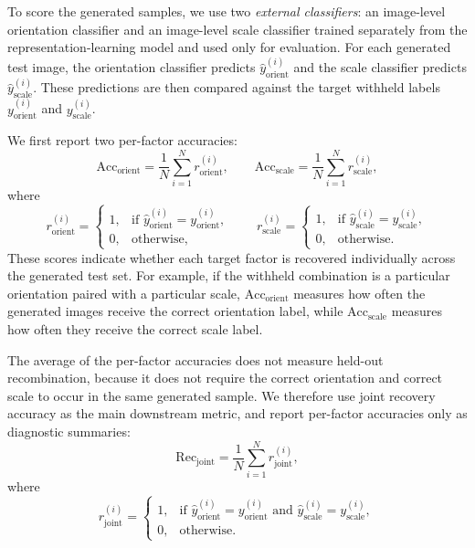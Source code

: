 To score the generated samples, we use two \emph{external classifiers}: an image-level orientation classifier and an image-level scale classifier trained separately from the representation-learning model and used only for evaluation. 
For each generated test image, the orientation classifier predicts \(\hat{y}^{(i)}_{\mathrm{orient}}\) and the scale classifier predicts \(\hat{y}^{(i)}_{\mathrm{scale}}\). These predictions are then compared against the target withheld labels \(y^{(i)}_{\mathrm{orient}}\) and \(y^{(i)}_{\mathrm{scale}}\).

We first report two per-factor accuracies:
\[
\mathrm{Acc}_{\mathrm{orient}}
=
\frac{1}{N}\sum_{i=1}^{N} r_{\mathrm{orient}}^{(i)},
\qquad
\mathrm{Acc}_{\mathrm{scale}}
=
\frac{1}{N}\sum_{i=1}^{N} r_{\mathrm{scale}}^{(i)},
\]
where
\[
r_{\mathrm{orient}}^{(i)}
=
\begin{cases}
1, & \text{if } \hat{y}_{\mathrm{orient}}^{(i)} = y_{\mathrm{orient}}^{(i)},\\[6pt]
0, & \text{otherwise,}
\end{cases}
\qquad
r_{\mathrm{scale}}^{(i)}
=
\begin{cases}
1, & \text{if } \hat{y}_{\mathrm{scale}}^{(i)} = y_{\mathrm{scale}}^{(i)},\\[6pt]
0, & \text{otherwise.}
\end{cases}
\]
These scores indicate whether each target factor is recovered individually across the generated test set. For example, if the withheld combination is a particular orientation paired with a particular scale, \(\mathrm{Acc}_{\mathrm{orient}}\) measures how often the generated images receive the correct orientation label, while \(\mathrm{Acc}_{\mathrm{scale}}\) measures how often they receive the correct scale label.

The average of the per-factor accuracies does not measure held-out recombination, because it does not require the correct orientation and correct scale to occur in the same generated sample. We therefore use joint recovery accuracy as the main downstream metric, and report per-factor accuracies only as diagnostic summaries:
\[
\mathrm{Rec}_{\mathrm{joint}}
=
\frac{1}{N}\sum_{i=1}^{N} r_{\mathrm{joint}}^{(i)},
\]
where
\[
r_{\mathrm{joint}}^{(i)}
=
\begin{cases}
1, & \text{if } \hat{y}^{(i)}_{\mathrm{orient}} = y^{(i)}_{\mathrm{orient}}
\text{ and }
\hat{y}^{(i)}_{\mathrm{scale}} = y^{(i)}_{\mathrm{scale}},\\[6pt]
0, & \text{otherwise.}
\end{cases}
\]

